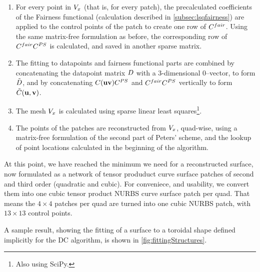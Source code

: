 \begin{enumerate}
\item For every point in $\petersPatchPoints$ (that is, for every \Bez patch), the precalculated coefficients of the Fairness functional (calculation described in \autoref{subsec:lsqfairness}) are applied to the \Bez control points of the patch to create one row of $\lsControlPointCoefMatrix^{fair}$. Using the same matrix-free formulation as before, the corresponding row of $\lsControlPointCoefMatrix^{fair}\lsControlPointCoefMatrix^{PS}$ is calculated, and saved in another sparse matrix.
\item The fitting to datapoints and fairness functional parts are combined by concatenating the datapoint matrix $\lsDataPointMatrix$ with a 3-dimensional $0$--vector, to form $\lsDataPointConcMatrix$, and by concatenating $\lsControlPointCoefMatrix(\vec{u}\vec{v})\lsControlPointCoefMatrix^{PS}$ and  $\lsControlPointCoefMatrix^{fair}\lsControlPointCoefMatrix^{PS}$ vertically to form $\lsControlCoefConcMatrix(\vec{u},\vec{v})$.
\item The mesh $\petersPatchPoints$ is calculated using sparse linear least squares\footnote{Also using SciPy.}.
\item The \Bez points of the patches are reconstructed from $\petersPatchPoints$, quad-wise, using a matrix-free formulation of the second part of Peters' scheme, and the lookup of point locations calculated in the beginning of the algorithm.
\end{enumerate}
At this point, we have reached the minimum we need for a reconstructed surface, now formulated as a network of tensor produduct \Bez curve surface patches of second and third order (quadratic and cubic). For conveniece, and usability, we convert them into one cubic tensor product NURBS curve surface patch per quad. That means the $4\times4$ \Bez patches per quad are turned into one cubic NURBS patch, with $13\times13$ control points. 

A sample result, showing the fitting of a surface to a toroidal shape defined implicitly for the \acs{DC} algorithm, is shown in \autoref{fig:fittingStructures}. 

